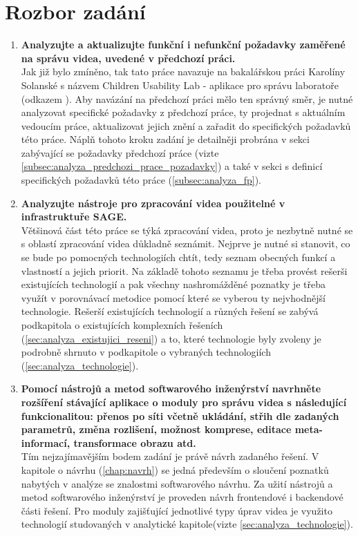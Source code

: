 \documentclass[thesis=M,czech]{FITthesis}[2012/06/26]
\begin{document}
\section{Rozbor zadání} \label{sec:analyza_rozbor_zadani}
\begin{enumerate}
	\item \textbf{Analyzujte a aktualizujte funkční i nefunkční požadavky zaměřené na správu videa, uvedené v předchozí
práci.\\}
	Jak již bylo zmíněno, tak tato práce navazuje na bakalářskou práci Karolíny Solanské s názvem Children Usability Lab - aplikace pro správu laboratoře (odkazem \cite{solankar}). Aby navázání na předchozí práci mělo ten správný směr, je nutné analyzovat specifické požadavky z předchozí práce, ty projednat s aktuálním vedoucím práce, aktualizovat jejich znění a zařadit do specifických požadavků této práce. Náplň tohoto kroku zadání je detailněji probrána v sekci zabývající se požadavky předchozí práce (vizte \ref{subsec:analyza_predchozi_prace_pozadavky}) a také v sekci s definicí specifických požadavků této práce (\ref{subsec:analyza_fp}).
	\item \textbf{Analyzujte nástroje pro zpracování videa použitelné v infrastruktuře SAGE.\\}
	Většinová část této práce se týká zpracování videa, proto je nezbytně nutné se s oblastí zpracování videa důkladně seznámit. 
	Nejprve je nutné si stanovit, co se bude po pomocných technologiích chtít, tedy seznam obecných funkcí a vlastností a jejich priorit. Na základě tohoto seznamu je třeba provést rešerši existujících technologií a pak všechny nashromážděné poznatky je třeba využít v porovnávací metodice pomocí které se vyberou ty nejvhodnější technologie. Rešerší existujících technologií a různých řešení se zabývá podkapitola o existujících komplexních řešeních (\ref{sec:analyza_existujici_reseni}) a to, které technologie byly zvoleny je podrobně shrnuto v podkapitole o vybraných technologiích (\ref{sec:analyza_technologie}).
	\item \textbf{Pomocí nástrojů a metod softwarového inženýrství navrhněte rozšíření stávající aplikace o moduly pro
správu videa s následující funkcionalitou: přenos po síti včetně ukládání, střih dle zadaných parametrů,
změna rozlišení, možnost komprese, editace meta-informací, transformace obrazu atd.\\}
	Tím nejzajímavějším bodem zadání je právě návrh zadaného řešení. V kapitole o návrhu (\ref{chap:navrh}) se jedná především o sloučení poznatků nabytých v analýze se znalostmi softwarového návrhu. Za užití nástrojů a metod softwarového inženýrství je proveden návrh frontendové i backendové části řešení. Pro moduly zajišťující jednotlivé typy úprav videa je využito technologií studovaných v analytické kapitole(vizte \ref{sec:analyza_technologie}).  

\end{enumerate}
\end{document}
